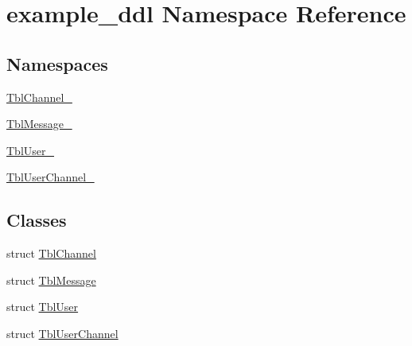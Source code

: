\hypertarget{namespaceexample__ddl}{}\section{example\+\_\+ddl Namespace Reference}
\label{namespaceexample__ddl}
\subsection*{Namespaces}
\begin{DoxyCompactItemize}
\item 
 \hyperlink{namespaceexample__ddl_1_1TblChannel__}{Tbl\+Channel\+\_\+}
\item 
 \hyperlink{namespaceexample__ddl_1_1TblMessage__}{Tbl\+Message\+\_\+}
\item 
 \hyperlink{namespaceexample__ddl_1_1TblUser__}{Tbl\+User\+\_\+}
\item 
 \hyperlink{namespaceexample__ddl_1_1TblUserChannel__}{Tbl\+User\+Channel\+\_\+}
\end{DoxyCompactItemize}
\subsection*{Classes}
\begin{DoxyCompactItemize}
\item 
struct \hyperlink{structexample__ddl_1_1TblChannel}{Tbl\+Channel}
\item 
struct \hyperlink{structexample__ddl_1_1TblMessage}{Tbl\+Message}
\item 
struct \hyperlink{structexample__ddl_1_1TblUser}{Tbl\+User}
\item 
struct \hyperlink{structexample__ddl_1_1TblUserChannel}{Tbl\+User\+Channel}
\end{DoxyCompactItemize}
